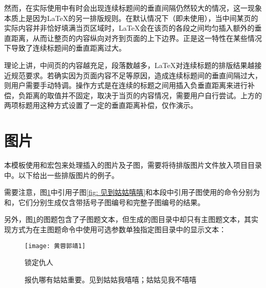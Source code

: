 \documentclass[doctor, vlined]{DissertUESTC}
\begin{document}
	然而，在实际使用中有时会出现连续标题间的垂直间隔仍然较大的情况，这一现象本质上是因为LaTeX的另一排版规则。在默认情况下（即未使用），当中间某页的实际内容并非恰好填满当页区域时，LaTeX会在该页的各段之间均匀插入额外的垂直距离，从而让整页的内容纵向对齐到页面的上下边界。正是这一特性在某些情况下导致了连续标题间的垂直距离过大。

	理论上讲，中间页的内容越充足，段落数越多，LaTeX对连续标题的排版结果越接近规范要求。若确实因为页面内容不足等原因，造成连续标题间的垂直间隔过大，则用户需要手动特调。操作方式是在连续的标题之间用插入负垂直距离来进行补偿，负距离的取值并不固定，取决于当页的内容情况，需要用户自行尝试。上方的两项标题用这种方式设置了一定的垂直距离补偿，仅作演示。
	
	\section{图片}
	
	本模板使用\href{https://mirror.nyist.edu.cn/CTAN/macros/latex/required/graphics/grfguide.pdf}{\ttfamily\color{DarkRed}}和\href{https://mirrors.bfsu.edu.cn/CTAN/macros/latex/contrib/subfig/subfig.pdf}{\ttfamily\color{DarkRed}}宏包来处理插入的图片及子图，需要将待排版图片文件放入项目目录中。以下给出一些排版图片的例子。
	
	需要注意，图\ref{fig: 报仇哪有姑姑重要}中引用子图\ref{fig: 见到姑姑嘻嘻}和本段中引用子图使用的命令分别为和，它们分别生成仅含带括号子图编号和完整子图编号的结果。
	
	另外，图\ref{fig: 报仇哪有姑姑重要}的图题包含了子图题文本，但生成的图目录中却只有主图题文本，其实现方式为在主图题命令中使用可选参数单独指定图目录中的显示文本：

	\begin{figure}[!h]
		\centering
		\texttt{[image: 黄蓉郭靖1]}
		\caption{锁定仇人}
	\end{figure}
	
	\begin{figure}[!h]
		\centering
		\hfill
		\caption[报仇哪有姑姑重要]{报仇哪有姑姑重要。见到姑姑我嘻嘻；姑姑见我不嘻嘻} \label{fig: 报仇哪有姑姑重要}
	\end{figure}
	
\end{document}
